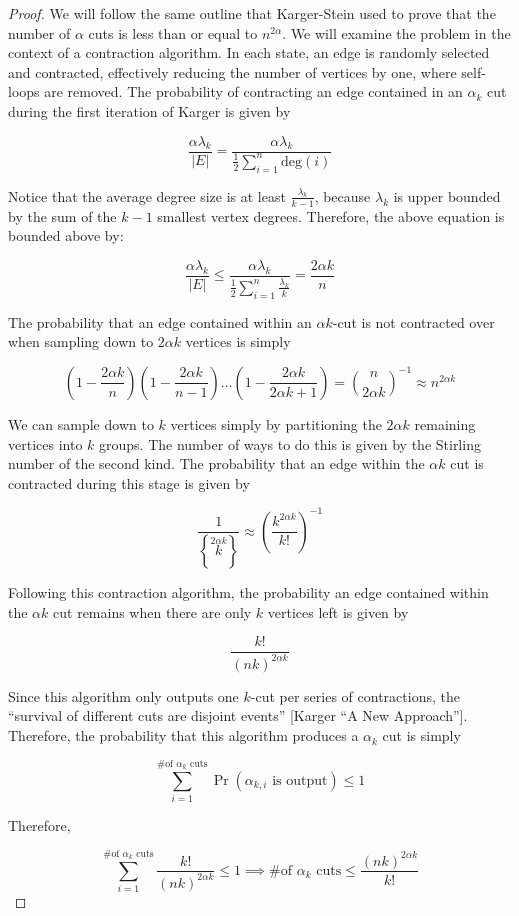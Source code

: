 \documentclass[12pt]{article}
\begin{document}
\begin{proof}
We will follow the same outline that Karger-Stein used to prove that the number of $\alpha$ cuts is less than or equal to $n^{2 \alpha}$. We will examine the problem in the context of a contraction algorithm. In each state, an edge is randomly selected and contracted, effectively reducing the number of vertices by one, where self-loops are removed. The probability of contracting an edge contained in an $\alpha_k$ cut during the first iteration of Karger is given by

\[
\frac{\alpha \lambda_k}{|E|} = \frac{\alpha \lambda_k}{\frac{1}{2} \sum_{i=1}^n \text{deg}(i)}
\]

Notice that the average degree size is at least $\frac{\lambda_k}{k-1}$, because $\lambda_k$ is upper bounded by the sum of the $k-1$ smallest vertex degrees. Therefore, the above equation is bounded above by:

\[
\frac{\alpha \lambda_k}{|E|} \leq \frac{\alpha \lambda_k}{\frac{1}{2} \sum_{i=1}^n \frac{\lambda_k}{k}} = \frac{2 \alpha k}{n}
\]

The probability that an edge contained within an $\alpha k$-cut is not contracted over when sampling down to $2 \alpha k$ vertices is simply 

\[
\left (1 - \frac{2 \alpha k}{n} \right) \left(1 - \frac{2 \alpha k}{n-1} \right) \ldots \left( 1 - \frac{2 \alpha k}{2 \alpha k + 1}\right) = \binom{n}{2 \alpha k}^{-1} \approx n^{2 \alpha k}
\]

We can sample down to $k$ vertices simply by partitioning the 
$2 \alpha k$ remaining vertices into $k$ groups. The number of ways to do this is given by the Stirling number of the second kind. The probability that an edge within the $\alpha k$ cut is contracted during this stage is given by

\[
\frac{1}{ \left \{ \overset{2 \alpha k }{k} \right \}} \approx \left( \frac{k^{2 \alpha k}}{k!} \right)^{-1}
\]

Following this contraction algorithm, the probability an edge contained within the $\alpha k$ cut remains when there are only $k$ vertices left is given by

\[
\frac{k!}{(nk)^{2 \alpha k}}
\]

Since this algorithm only outputs one $k$-cut per series of contractions, the ``survival of different cuts are disjoint events'' [Karger ``A New Approach'']. Therefore, the probability that this algorithm produces a $\alpha_k$ cut is simply

\[
\sum_{i=1}^{\text{\# of } \alpha_k \text{ cuts}} \Pr(\alpha_{k,i} \text{ is output}) \leq 1
\]

Therefore, 

\[
\sum_{i=1}^{\text{\# of } \alpha_k \text{ cuts}} \frac{k!}{(nk)^{2 \alpha k}} \leq 1 \implies \text{\# of } \alpha_k \text{ cuts} \leq \frac{(nk)^{2 \alpha k}}{k!}
\]

\end{proof}
\end{document}
